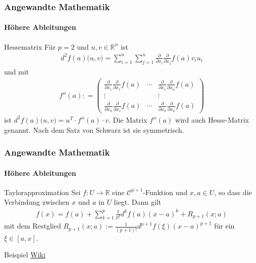\documentclass{beamer}
\begin{document}
\begin{frame}
    \frametitle{Angewandte Mathematik}
\framesubtitle{Höhere Ableitungen}
    \begin{block}{Hessematrix}
Für $p = 2$ und $u,v \in \mathbb{R}^n$ ist
\begin{align*}
d^2f(a) \bigl(u , v ) = \sum_{i = 1}^n \sum_{j = 1}^n \frac{\partial}{\partial x_{i}}  \frac{\partial}{\partial x_{j}} f(a) v_{i}  u_{i} 
\end{align*}
und mit 
\begin{align*}
f''(a) : = \begin{pmatrix}  \frac{\partial}{\partial x_{1}} \frac{\partial}{\partial x_{1}} f(a)   &  \cdots &  \frac{\partial}{\partial x_{1}} \frac{\partial}{\partial x_{n}} f(a) \\
\vdots & & \vdots  \\
 \frac{\partial}{\partial x_{n}} \frac{\partial}{\partial x_{1}} f(a)   &  \cdots &  \frac{\partial}{\partial x_{n}} \frac{\partial}{\partial x_{n}} f(a)
\end{pmatrix} 
\end{align*}
ist $d^2f(a) \bigl(u , v ) = u^T  \cdot f''(a) \cdot v$. Die Matrix $f''(a)$ wird auch Hesse-Matrix genannt. Nach dem Satz von Schwarz ist sie symmetrisch.
\end{block}
 \end{frame}

\begin{frame}
    \frametitle{Angewandte Mathematik}
\framesubtitle{Höhere Ableitungen}
    \begin{block}{Taylorapproximation}
Sei   $f: U \to \mathbb{R}$ eine $\mathcal{C}^{p+1}$-Funktion und $x,a \in U$, so dass die Verbindung zwischen $x$ und $a$ in $U$ liegt.
Dann gilt
\begin{align*}
f(x) = f(a) + \sum_{k=1}^{p}\frac{1}{p!} d^k f(a) (x-a)^k + R_{p+1} (x;a)
\end{align*}
mit dem Restglied $R_{p+1} (x;a) := \frac{1}{(p+1)!} d^{p+1}f(\xi) (x-a)^{p+1}$ für ein $\xi \in [a,x]$.

\end{block}
\begin{block}{Beispiel}
\href{https://de.wikipedia.org/wiki/Taylor-Formel\#Taylor-Formel_im_Mehrdimensionalen}{Wiki}
\end{block}
 \end{frame}
\end{document}
